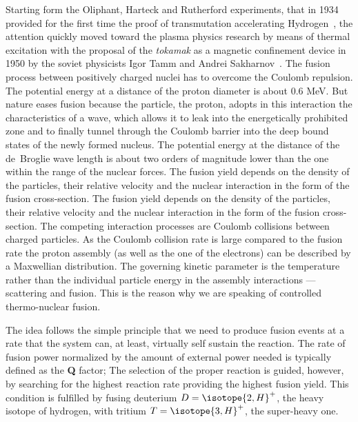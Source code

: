 Starting form the Oliphant, Harteck and Rutherford experiments, that in 1934 provided for the first time the proof of transmutation accelerating Hydrogen~\cite{1934RSPSA.144..692O}, the attention quickly moved toward the plasma physics research by means of thermal excitation with the proposal of the \textit{tokamak} as a magnetic confinement device in 1950 by the soviet physicists Igor Tamm and Andrei Sakharnov~\cite{}. 
%
The fusion process between positively charged nuclei has to overcome the Coulomb repulsion. The potential energy at a distance of the proton diameter is about 0.6 MeV. But nature eases fusion because the particle, the proton, adopts in this interaction the characteristics of a wave, which allows it to leak into the energetically prohibited zone and to finally tunnel through the Coulomb barrier into the deep bound states of the newly formed nucleus. The potential energy at the distance of the de~Broglie wave length is about two orders of magnitude lower than the one within the range of the nuclear forces. The fusion yield depends on the density of the particles, their relative velocity and the nuclear interaction in the form of the fusion cross-section. 
The fusion yield depends on the density of the particles, their relative velocity and the nuclear interaction in the form of the fusion cross-section. The competing interaction processes are Coulomb collisions between charged particles. As the Coulomb collision rate is large compared to the fusion rate the proton assembly (as well as the one of the electrons) can be described by a Maxwellian distribution. The governing kinetic parameter is the temperature rather than the individual particle energy in the assembly interactions — scattering and fusion. This is the reason why we are speaking of controlled thermo-nuclear fusion.

The idea follows the simple principle that we need to produce fusion events at a rate that the system can, at least, virtually self sustain the reaction. 
\cite{Wagner.Friedrich:magnetic.confinement.intro}
The rate of fusion power normalized by the amount of external power needed is typically defined as the \textbf{Q} factor; 
The selection of the proper reaction is guided, however, by searching for the highest reaction rate providing the highest fusion yield. This condition is fulfilled by fusing deuterium $D=\isotope{2,H}^+$, the heavy isotope of hydrogen, with tritium $T=\isotope{3,H}^+$, the super-heavy one.



